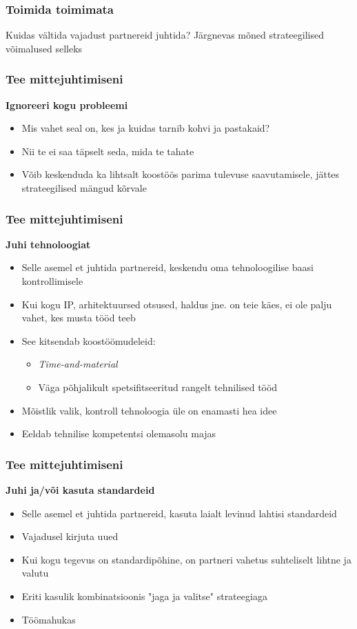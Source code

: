 \begin{frame}[fragile]
  \frametitle{Toimida toimimata}
	\begin{center}
			Kuidas vältida vajadust partnereid juhtida?
			\vfill
			Järgnevas mõned strateegilised võimalused selleks
	\end{center}
\end{frame}


\begin{frame}[fragile]
  \frametitle{Tee mittejuhtimiseni}
	\textbf{Ignoreeri kogu probleemi}
	\begin{itemize}
		\item Mis vahet seal on, kes ja kuidas tarnib kohvi ja pastakaid?
		\item Nii te ei saa täpselt seda, mida te tahate
		\item Võib keskenduda ka lihtsalt koostöös parima tulevuse saavutamisele, jättes strateegilised mängud kõrvale
	\end{itemize}
\end{frame}

\begin{frame}[fragile]
  \frametitle{Tee mittejuhtimiseni}
		\textbf{Juhi tehnoloogiat}
	\begin{itemize}
		\item Selle asemel et juhtida partnereid, keskendu oma tehnoloogilise baasi kontrollimisele
		\item Kui kogu IP, arhitektuursed otsused, haldus jne. on teie käes, ei ole palju vahet, kes musta tööd teeb
		\item See kitsendab koostöömudeleid:
		\begin{itemize}
			\item \emph{Time-and-material}
			\item Väga põhjalikult spetsifitseeritud rangelt tehnilised tööd
		\end{itemize}
		\item Mõistlik valik, kontroll tehnoloogia üle on enamasti hea idee
		\item Eeldab tehnilise kompetentsi olemasolu majas
	\end{itemize}
\end{frame}

\begin{frame}[fragile]
  \frametitle{Tee mittejuhtimiseni}
		\textbf{Juhi ja/või kasuta standardeid}
	\begin{itemize}
		\item Selle asemel et juhtida partnereid, kasuta laialt levinud lahtisi standardeid
		\item Vajadusel kirjuta uued
		\item Kui kogu tegevus on standardipõhine, on partneri vahetus suhteliselt lihtne ja valutu
		\item Eriti kasulik kombinatsioonis "jaga ja valitse" strateegiaga
		\item Töömahukas
	\end{itemize}
\end{frame}


